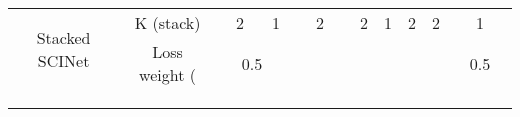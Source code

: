 \documentclass{article}
\begin{document}
\begin{table*}[h]
{\begin{tabular}{ccclllclllclllclll}
\multicolumn{1}{c|}{\multirow{2}{*}{Stacked SCINet}} & \multicolumn{1}{c|}{K (stack)}                            & \multicolumn{3}{c|}{2}  & \multicolumn{1}{c|}{1}                                                                            & \multicolumn{4}{c|}{2}                                                                              & \multicolumn{1}{c|}{2}& \multicolumn{1}{c|}{1}& \multicolumn{1}{c|}{2}& \multicolumn{1}{c|}{2}                                                                              & \multicolumn{4}{c}{1}                                                                             \\ \cline{2-18} 
\multicolumn{1}{c|}{}                                & \multicolumn{1}{c|}{Loss weight (} & \multicolumn{4}{c|}{0.5}                                                          & \multicolumn{4}{c|}{}                                                                            & \multicolumn{4}{c|}{}                                                          & \multicolumn{4}{c}{0.5}                                                                           \\ \hline
\multicolumn{1}{l}{}                                 & \multicolumn{1}{l}{}                                      & \multicolumn{1}{l}{}   &                        &                         &                         & \multicolumn{1}{l}{}   &                        &                         &                         & \multicolumn{1}{l}{}   &                        &                         &                         & \multicolumn{1}{l}{}   &                        &                         &                        \\
\multicolumn{1}{l}{}                                 & \multicolumn{1}{l}{}                                      & \multicolumn{1}{l}{}   &                        &                         &                         & \multicolumn{1}{l}{}   &                        &                         &                         & \multicolumn{1}{l}{}   &                        &                         &                         & \multicolumn{1}{l}{}   &                        &                         &                        \\
\multicolumn{1}{l}{}                                 & \multicolumn{1}{l}{}                                      & \multicolumn{1}{l}{}   &                        &                         &                         & \multicolumn{1}{l}{}   &                        &                         &                         & \multicolumn{1}{l}{}   &                        &                         &                         & \multicolumn{1}{l}{}   &                        &                         &                       
\end{tabular}}
\label{tab:hsolar}
\vspace{-24pt}
\end{table*}
\end{document}
